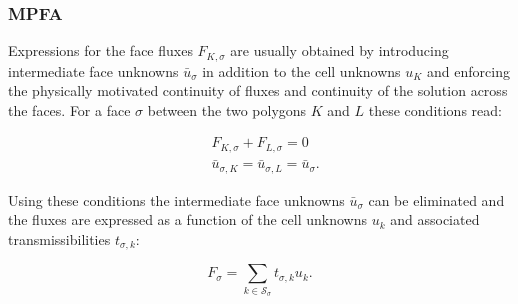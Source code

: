  

\subsubsection{MPFA}\label{cc_mpfa}
Expressions for the face fluxes $F_{K, \sigma}$ are usually obtained by introducing intermediate face unknowns $\bar{u}_\sigma$ in addition to the cell unknowns $u_K$ and enforcing the physically motivated continuity of fluxes and continuity of the solution across the faces. For a face $\sigma$ between the two polygons $K$ and $L$ these conditions read:

\begin{equation}
    \begin{aligned}
        &F_{K, \sigma} + F_{L, \sigma} = 0 \\
        &\bar{u}_{\sigma, K} = \bar{u}_{\sigma, L} = \bar{u}_{\sigma}.
        \label{eq:sigmaConditions}
    \end{aligned}
\end{equation}

Using these conditions the intermediate face unknowns $\bar{u}_\sigma$ can be eliminated and the fluxes are expressed as a function of the cell unknowns $u_k$ and associated transmissibilities $t_{\sigma, k}$:

\begin{equation}
    F_{\sigma} = \sum_{k \in \mathcal{S}_\sigma} t_{\sigma, k} u_{k}.
    \label{eq:FVFluxExpression}
\end{equation}

%  

